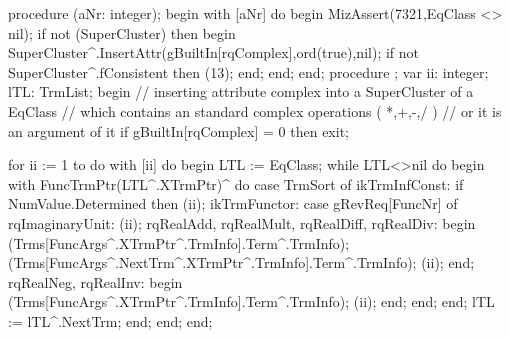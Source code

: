 procedure (aNr: integer);
begin
   with [aNr] do
   begin
      MizAssert(7321,EqClass <> nil);
      if not (SuperCluster) then
      begin
         SuperCluster^.InsertAttr(gBuiltIn[rqComplex],ord(true),nil);
         if not SuperCluster^.fConsistent then (13);
      end;
   end;
end;
\eatline
{}\nwendcode{}\nwdocspar
\nwenddocs{}\endmoddef\nwstartdeflinemarkup\nwenddeflinemarkup
procedure ;
var
   ii: integer;
   lTL: TrmList;
begin
   // inserting attribute complex into a SuperCluster of a EqClass
   // which contains an standard complex operations ( *,+,-,/ )
   // or it is an argument of it
   if gBuiltIn[rqComplex] = 0 then exit;
   
   for ii := 1 to  do
      with [ii] do
   begin
      LTL := EqClass;
      while LTL<>nil do
      begin
         with FuncTrmPtr(LTL^.XTrmPtr)^ do
      case TrmSort of
         ikTrmInfConst:
            if NumValue.Determined then
               (ii);
         ikTrmFunctor:
            case gRevReq[FuncNr] of
               rqImaginaryUnit:
                  (ii);
               rqRealAdd,  rqRealMult, rqRealDiff, rqRealDiv:
                  begin
                     (Trms[FuncArgs^.XTrmPtr^.TrmInfo].Term^.TrmInfo);
                     (Trms[FuncArgs^.NextTrm^.XTrmPtr^.TrmInfo].Term^.TrmInfo);
                     (ii);
                  end;
               rqRealNeg, rqRealInv:
                  begin
                     (Trms[FuncArgs^.XTrmPtr^.TrmInfo].Term^.TrmInfo);
                     (ii);
                  end;
            end;
      end;
         lTL := lTL^.NextTrm;
      end;
   end;
end;

